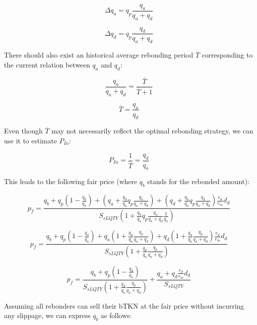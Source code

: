 \documentclass{article}
\begin{document}
\begin{equation}
\Delta q_{a} = q_{p} \frac{q_{a}}{q_{a}+q_{d}}
\end{equation}

\begin{equation}
\Delta q_{d} = q_{p} \frac{q_{d}}{q_{a}+q_{d}}
\end{equation}

There should also exist an historical average rebonding period $\overline{T}$ corresponding to the current relation between $q_a$ and $q_d$:

\begin{equation}
    \frac{q_{a}}{q_{a}+q_{d}} = \frac{\overline{T}}{\overline{T}+1}
\end{equation}

\begin{equation}
    \overline{T} = \frac{q_{a}}{q_{d}}
\end{equation}

Even though $\overline{T}$ may not necessarily reflect the optimal rebonding strategy, we can use it to estimate $P_{In}$:

\begin{equation}
   P_{In} = \frac{1}{\overline{T}} = \frac{q_{d}}{q_{a}}
\end{equation}

This leads to the following fair price (where $q_b$ stands for the rebonded amount):

\[
p_{f} = \frac{q_{b}+q_{p} \left(1-\frac{q_{d}}{q_{a}}\right)+\left(q_{a}+\frac{q_{d}}{q_{a}}q_{p}\frac{q_{a}}{q_{a}+q_{d}}\right)+ \left(q_{d}+\frac{q_{d}}{q_{a}}q_{p}\frac{q_{d}}{q_{a}+q_{d}}\right)\frac{r_{d}}{r_{m}}d_{d}}{S_{sLQTY} \left( 1+\frac{q_{d}}{q_{a}} q_{p}\frac{q_{a}}{q_{a}+q_{d}}\frac{1}{q_{a}} \right)}
\]

\[
p_{f} = \frac{q_{b}+q_{p} \left(1-\frac{q_{d}}{q_{a}}\right)+q_{a}\left(1+\frac{q_{d}}{q_{a}}\frac{q_{p}}{q_{a}+q_{d}}\right)+q_{d} \left(1+\frac{q_{d}}{q_{a}}\frac{q_{p}}{q_{a}+q_{d}}\right)\frac{r_{d}}{r_{m}}d_{d}}{S_{sLQTY} \left( 1+\frac{q_{d}}{q_{a}}\frac{q_{p}}{q_{a}+q_{d}} \right)}
\]

\begin{equation}
p_{f} = \frac{q_{b}+q_{p} \left(1-\frac{q_{d}}{q_{a}}\right)}{S_{sLQTY} \left( 1+\frac{q_{d}}{q_{a}}\frac{q_{p}}{q_{a}+q_{d}} \right)} + \frac{q_{a}+q_{d}\frac{r_{d}}{r_{m}}d_{d}}{S_{sLQTY}}
\end{equation}

Assuming all rebonders can sell their bTKN at the fair price without incurring any slippage, we can express $q_b$ as follows:
\end{document}
